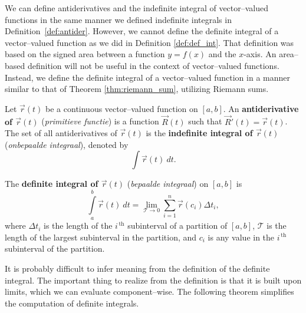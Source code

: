 We can define antiderivatives and the indefinite integral of vector--valued functions in the same manner we defined indefinite integrals in Definition~\ref{def:antider}. However, we cannot define the definite integral of a vector--valued function as we did in Definition \ref{def:def_int}. That definition was based on the signed area between a function $y=f(x)$ and the $x$-axis. An area--based definition will not be useful in the context of vector--valued functions.
Instead, we define the definite integral of a vector--valued function in a manner similar to that of Theorem \ref{thm:riemann_sum}, utilizing Riemann sums. 

\begin{definition}\label{def:vvf_integral}
Let $\vec r(t)$ be a continuous vector--valued function on $[a,b]$. An \textbf{antiderivative of $\vec r(t)$} (\textit{primitieve functie}) is a function $\vec R(t)$ such that $\vec R'(t) = \vec r(t)$.\\

The set of all antiderivatives of $\vec r(t)$ is the \textbf{indefinite integral of $\vec r(t)$} (\textit{onbepaalde integraal}), denoted by 
$$\int \vec r(t)\ dt.$$

The \textbf{definite integral  of $\vec r(t)$} (\textit{bepaalde integraal}) on $[a,b]$ is 
$$\int\limits_a^b \vec r(t)\ dt =\lim_{\mathcal{T}\to 0} \sum_{i=1}^n\vec r(c_i)\Delta t_i,$$ where $\Delta t_i$ is the length of the $i^{\,\text{th}}$ subinterval of a partition of $[a,b]$, $\mathcal{T}$ is the length of the largest subinterval in the partition, and $c_i$ is any value in the $i^{\,\text{th}}$ subinterval of the partition.%
\end{definition}

It is probably difficult to infer meaning from the definition of the definite integral. The important thing to realize from the definition is that it is built upon limits, which we can evaluate component--wise.  The following theorem simplifies the computation of definite integrals.


